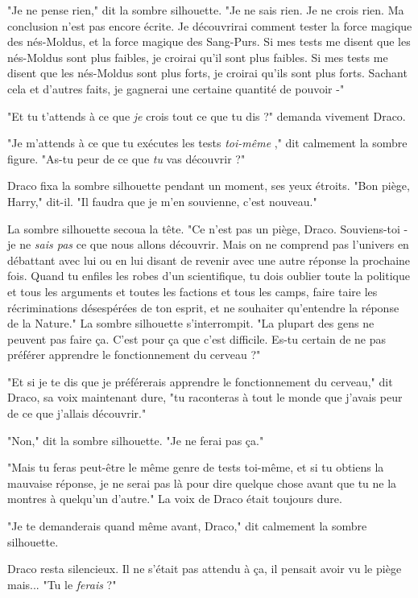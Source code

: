 "Je ne pense rien," dit la sombre silhouette. "Je ne sais rien. Je ne crois rien. Ma conclusion n'est pas encore écrite. Je découvrirai comment tester la force magique des nés-Moldus, et la force magique des Sang-Purs. Si mes tests me disent que les nés-Moldus sont plus faibles, je croirai qu'il sont plus faibles. Si mes tests me disent que les nés-Moldus sont plus forts, je croirai qu'ils sont plus forts. Sachant cela et d'autres faits, je gagnerai une certaine quantité de pouvoir -"

"Et tu t'attends à ce que \emph{je}  crois tout ce que tu dis ?" demanda vivement Draco.

"Je m'attends à ce que tu exécutes les tests \emph{toi-même} ," dit calmement la sombre figure. "As-tu peur de ce que \emph{tu}  vas découvrir ?"

Draco fixa la sombre silhouette pendant un moment, ses yeux étroits. "Bon piège, Harry," dit-il. "Il faudra que je m'en souvienne, c'est nouveau."

La sombre silhouette secoua la tête. "Ce n'est pas un piège, Draco. Souviens-toi - je ne \emph{sais pas}  ce que nous allons découvrir. Mais on ne comprend pas l'univers en débattant avec lui ou en lui disant de revenir avec une autre réponse la prochaine fois. Quand tu enfiles les robes d'un scientifique, tu dois oublier toute la politique et tous les arguments et toutes les factions et tous les camps, faire taire les récriminations désespérées de ton esprit, et ne souhaiter qu'entendre la réponse de la Nature." La sombre silhouette s'interrompit. "La plupart des gens ne peuvent pas faire ça. C'est pour ça que c'est difficile. Es-tu certain de ne pas préférer apprendre le fonctionnement du cerveau ?"

"Et si je te dis que je préférerais apprendre le fonctionnement du cerveau," dit Draco, sa voix maintenant dure, "tu raconteras à tout le monde que j'avais peur de ce que j'allais découvrir."

"Non," dit la sombre silhouette. "Je ne ferai pas ça."

"Mais tu feras peut-être le même genre de tests toi-même, et si tu obtiens la mauvaise réponse, je ne serai pas là pour dire quelque chose avant que tu ne la montres à quelqu'un d'autre." La voix de Draco était toujours dure.

"Je te demanderais quand même avant, Draco," dit calmement la sombre silhouette.

Draco resta silencieux. Il ne s'était pas attendu à ça, il pensait avoir vu le piège mais... "Tu le \emph{ferais}  ?"

